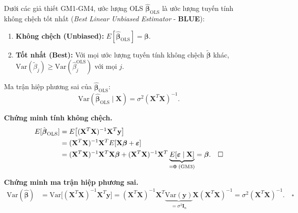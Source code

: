 \begin{tcolorbox}[mycodebox, colback=blue!3!white, colframe=blue!40!black,
    title={\textbf{Định lý 1.2} - Gauss-Markov (BLUE)}]
Dưới các giả thiết GM1-GM4, ước lượng OLS
$\hat{\boldsymbol{\beta}}_{\mathrm{OLS}}$ là ước lượng tuyến tính không
chệch tốt nhất (\emph{Best Linear Unbiased Estimator} - \textbf{BLUE}):
\begin{enumerate}[label=(\roman*)]
    \item \textbf{Không chệch (Unbiased):}
          $E[\hat{\boldsymbol{\beta}}_{\mathrm{OLS}}] = \boldsymbol{\beta}$.
    \item \textbf{Tốt nhất (Best):} Với mọi ước lượng tuyến tính không chệch
          $\tilde{\boldsymbol{\beta}}$ khác,
          $\mathrm{Var}(\tilde{\beta}_j) \geq \mathrm{Var}(\hat{\beta}_j^{\mathrm{OLS}})$
          với mọi $j$.
\end{enumerate}
Ma trận hiệp phương sai của $\hat{\boldsymbol{\beta}}_{\mathrm{OLS}}$:
\begin{equation}
    \mathrm{Var}(\hat{\boldsymbol{\beta}}_{\mathrm{OLS}} \mid \mathbf{X})
    = \sigma^2(\mathbf{X}^T\mathbf{X})^{-1}.
    \label{eq:var_beta}
\end{equation}
\end{tcolorbox}

\textbf{Chứng minh tính không chệch.}
\begin{align}
    E[\hat{\boldsymbol{\beta}}_{\mathrm{OLS}}]
    &= E\bigl[(\mathbf{X}^T\mathbf{X})^{-1}\mathbf{X}^T\mathbf{y}\bigr] \notag \\
    &= (\mathbf{X}^T\mathbf{X})^{-1}\mathbf{X}^T
       E[\mathbf{X}\boldsymbol{\beta} + \boldsymbol{\varepsilon}] \notag \\
    &= (\mathbf{X}^T\mathbf{X})^{-1}\mathbf{X}^T\mathbf{X}\boldsymbol{\beta}
       + (\mathbf{X}^T\mathbf{X})^{-1}\mathbf{X}^T
         \underbrace{E[\boldsymbol{\varepsilon} \mid \mathbf{X}]}_{=\mathbf{0}\text{ (GM3)}}
    = \boldsymbol{\beta}. \quad \square
\end{align}

\textbf{Chứng minh ma trận hiệp phương sai.}
\begin{align}
    \mathrm{Var}(\hat{\boldsymbol{\beta}})
    &= \mathrm{Var}\bigl[(\mathbf{X}^T\mathbf{X})^{-1}\mathbf{X}^T\mathbf{y}\bigr]
     = (\mathbf{X}^T\mathbf{X})^{-1}\mathbf{X}^T
       \underbrace{\mathrm{Var}(\mathbf{y})}_{=\sigma^2\mathbf{I}_n}
       \mathbf{X}(\mathbf{X}^T\mathbf{X})^{-1}
     = \sigma^2(\mathbf{X}^T\mathbf{X})^{-1}. \quad \square
\end{align}

